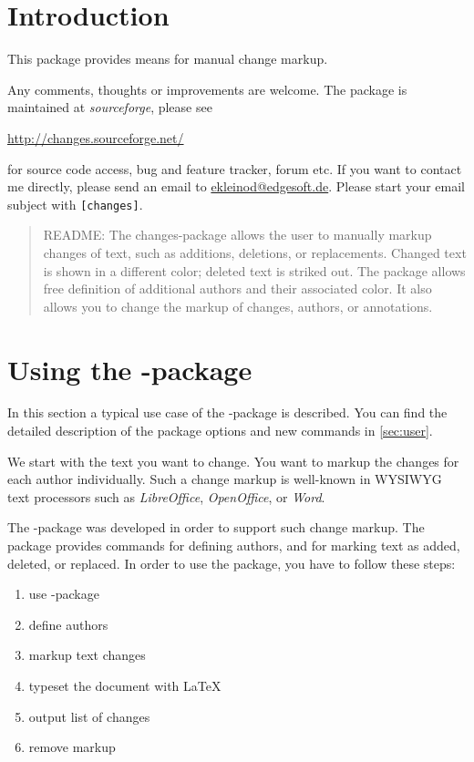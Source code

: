\section{Introduction}

This package provides means for manual change markup.

Any comments, thoughts or improvements are welcome.
The package is maintained at \emph{sourceforge}, please see

\url{http://changes.sourceforge.net/}

for source code access, bug and feature tracker, forum etc.
If you want to contact me directly, please send an email to \href{mailto:ekleinod@edgesoft.de}{ekleinod@edgesoft.de}.
Please start your email subject with \texttt{[changes]}.

\begin{quote}
	\small\textsc{README:}
	The changes-package allows the user to manually markup changes of text, such as additions, deletions, or replacements.
	Changed text is shown in a different color; deleted text is striked out.
	The package allows free definition of additional authors and their associated color.
	It also allows you to change the markup of changes, authors, or annotations.
\end{quote}


\section{Using the -package}
\label{sec:usage}

In this section a typical use case of the -package is described.
You can find the detailed description of the package options and new commands in \autoref{sec:user}.

We start with the text you want to change.
You want to markup the changes for each author individually.
Such a change markup is well-known in WYSIWYG text processors such as \emph{LibreOffice}, \emph{OpenOffice}, or \emph{Word}.

The -package was developed in order to support such change markup.
The package provides commands for defining authors, and for marking text as added, deleted, or replaced.
In order to use the package, you have to follow these steps:

\begin{enumerate}
	\item use -package
	\item define authors
	\item markup text changes
	\item typeset the document with \LaTeX
	\item output list of changes
	\item remove markup
\end{enumerate}


